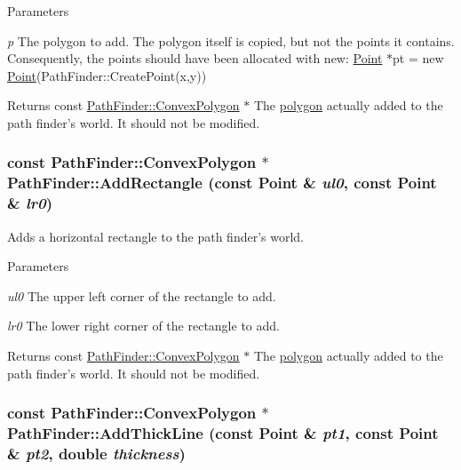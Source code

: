 \begin{DoxyParams}{Parameters}
\item[{\em p}]The polygon to add. The polygon itself is copied, but not the points it contains. Consequently, the points should have been allocated with new: \hyperlink{structPathFinder_1_1Point}{Point} $\ast$pt = new \hyperlink{structPathFinder_1_1Point}{Point}(PathFinder::CreatePoint(x,y)) \end{DoxyParams}
\begin{DoxyReturn}{Returns}
const \hyperlink{structPathFinder_1_1ConvexPolygon}{PathFinder::ConvexPolygon} $\ast$ The \hyperlink{structPathFinder_1_1ConvexPolygon}{polygon} actually added to the path finder's world. It should not be modified. 
\end{DoxyReturn}
\hypertarget{classPathFinder_a7b703516042173b63c24759b600d655e}{
\subsubsection[{AddRectangle}]{\setlength{\rightskip}{0pt plus 5cm}const {\bf PathFinder::ConvexPolygon} $\ast$ PathFinder::AddRectangle (const {\bf Point} \& {\em ul0}, \/  const {\bf Point} \& {\em lr0})}}
\label{classPathFinder_a7b703516042173b63c24759b600d655e}


Adds a horizontal rectangle to the path finder's world. 


\begin{DoxyParams}{Parameters}
\item[{\em ul0}]The upper left corner of the rectangle to add. \item[{\em lr0}]The lower right corner of the rectangle to add. \end{DoxyParams}
\begin{DoxyReturn}{Returns}
const \hyperlink{structPathFinder_1_1ConvexPolygon}{PathFinder::ConvexPolygon} $\ast$ The \hyperlink{structPathFinder_1_1ConvexPolygon}{polygon} actually added to the path finder's world. It should not be modified. 
\end{DoxyReturn}
\hypertarget{classPathFinder_a78778ee12c740256f30907e660c563b3}{
\subsubsection[{AddThickLine}]{\setlength{\rightskip}{0pt plus 5cm}const {\bf PathFinder::ConvexPolygon} $\ast$ PathFinder::AddThickLine (const {\bf Point} \& {\em pt1}, \/  const {\bf Point} \& {\em pt2}, \/  double {\em thickness})}}
\label{classPathFinder_a78778ee12c740256f30907e660c563b3}


